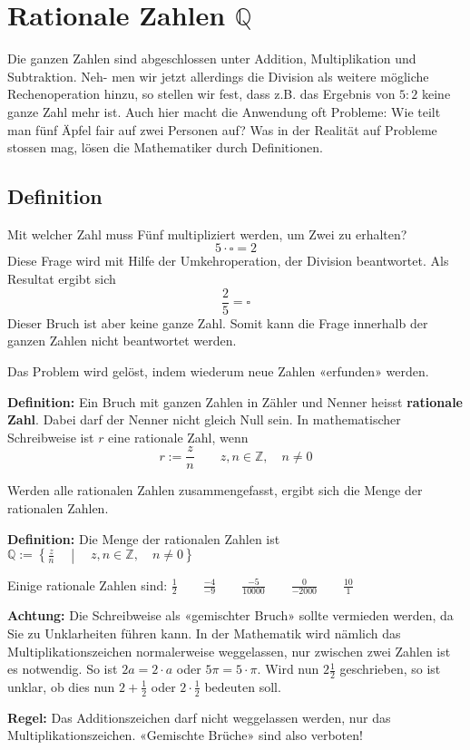 \newpage
\section{Rationale Zahlen $\mathbb{Q}$}

Die ganzen Zahlen sind abgeschlossen unter Addition, Multiplikation und Subtraktion. Neh- men wir jetzt allerdings die Division als weitere mögliche Rechenoperation hinzu, so stellen wir fest, dass z.B. das Ergebnis von $5:2$ keine ganze Zahl mehr ist. Auch hier macht die Anwendung oft Probleme: Wie teilt man fünf Äpfel fair auf zwei Personen auf? Was in der Realität auf Probleme stossen mag, lösen die Mathematiker durch Definitionen.

\subsection{Definition}

Mit welcher Zahl muss Fünf multipliziert werden, um Zwei zu erhalten?
\[
  5\cdot\square = 2
\]
Diese Frage wird mit Hilfe der Umkehroperation, der Division beantwortet. Als Resultat ergibt sich
\[
  \frac{2}{5} = \square
\]
Dieser Bruch ist aber keine ganze Zahl. Somit kann die Frage innerhalb der ganzen Zahlen nicht beantwortet werden.

Das Problem wird gelöst, indem wiederum neue Zahlen «erfunden» werden.

\textbf{Definition:} Ein Bruch mit ganzen Zahlen in Zähler und Nenner heisst \textbf{rationale Zahl}. Dabei darf der Nenner nicht gleich Null sein. In mathematischer Schreibweise ist $r$ eine rationale Zahl, wenn
  \[
    r := \frac{z}{n} \qquad z,n \in \mathbb{Z},\quad n \ne 0
  \]

Werden alle rationalen Zahlen zusammengefasst, ergibt sich die Menge der rationalen Zahlen.

\textbf{Definition:} Die Menge der rationalen Zahlen ist $\displaystyle \mathbb{Q} := \left\{ \frac{z}{n} \quad \middle| \quad z,n \in \mathbb{Z}, \quad n \ne 0 \right\}$

\begin{example}
  Einige rationale Zahlen sind: $\displaystyle \frac{1}{2} \qquad \frac{-4}{-9} \qquad \frac{-5}{10000} \qquad \frac{0}{-2000} \qquad \frac{10}{1}$
\end{example}
\begin{note}
  \textbf{Achtung:} Die Schreibweise als «gemischter Bruch» sollte vermieden werden, da Sie zu Unklarheiten führen kann. In der Mathematik wird nämlich das Multiplikationszeichen normalerweise weggelassen, nur zwischen zwei Zahlen ist es notwendig. So ist $2a = 2\cdot a$ oder $5\pi = 5\cdot\pi$. Wird nun $2\frac{1}{2}$ geschrieben, so ist unklar, ob dies nun $2+\frac{1}{2}$ oder $2\cdot\frac{1}{2}$ bedeuten soll.

  \textbf{Regel:} Das Additionszeichen darf nicht weggelassen werden, nur das Multiplikationszeichen. «Gemischte Brüche» sind also verboten!
\end{note}

